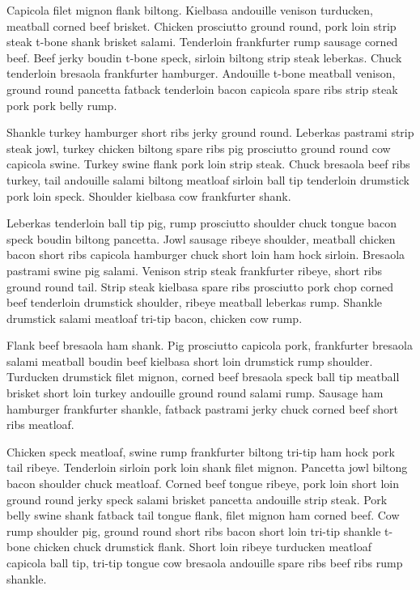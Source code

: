 Capicola filet mignon flank biltong. Kielbasa andouille venison turducken, meatball corned beef brisket. Chicken prosciutto ground round, pork loin strip steak t-bone shank brisket salami. Tenderloin frankfurter rump sausage corned beef. Beef jerky boudin t-bone speck, sirloin biltong strip steak leberkas. Chuck tenderloin bresaola frankfurter hamburger. Andouille t-bone meatball venison, ground round pancetta fatback tenderloin bacon capicola spare ribs strip steak pork pork belly rump.

Shankle turkey hamburger short ribs jerky ground round. Leberkas pastrami strip steak jowl, turkey chicken biltong spare ribs pig prosciutto ground round cow capicola swine. Turkey swine flank pork loin strip steak. Chuck bresaola beef ribs turkey, tail andouille salami biltong meatloaf sirloin ball tip tenderloin drumstick pork loin speck. Shoulder kielbasa cow frankfurter shank.

Leberkas tenderloin ball tip pig, rump prosciutto shoulder chuck tongue bacon speck boudin biltong pancetta. Jowl sausage ribeye shoulder, meatball chicken bacon short ribs capicola hamburger chuck short loin ham hock sirloin. Bresaola pastrami swine pig salami. Venison strip steak frankfurter ribeye, short ribs ground round tail. Strip steak kielbasa spare ribs prosciutto pork chop corned beef tenderloin drumstick shoulder, ribeye meatball leberkas rump. Shankle drumstick salami meatloaf tri-tip bacon, chicken cow rump.

Flank beef bresaola ham shank. Pig prosciutto capicola pork, frankfurter bresaola salami meatball boudin beef kielbasa short loin drumstick rump shoulder. Turducken drumstick filet mignon, corned beef bresaola speck ball tip meatball brisket short loin turkey andouille ground round salami rump. Sausage ham hamburger frankfurter shankle, fatback pastrami jerky chuck corned beef short ribs meatloaf.

Chicken speck meatloaf, swine rump frankfurter biltong tri-tip ham hock pork tail ribeye. Tenderloin sirloin pork loin shank filet mignon. Pancetta jowl biltong bacon shoulder chuck meatloaf. Corned beef tongue ribeye, pork loin short loin ground round jerky speck salami brisket pancetta andouille strip steak. Pork belly swine shank fatback tail tongue flank, filet mignon ham corned beef. Cow rump shoulder pig, ground round short ribs bacon short loin tri-tip shankle t-bone chicken chuck drumstick flank. Short loin ribeye turducken meatloaf capicola ball tip, tri-tip tongue cow bresaola andouille spare ribs beef ribs rump shankle.


